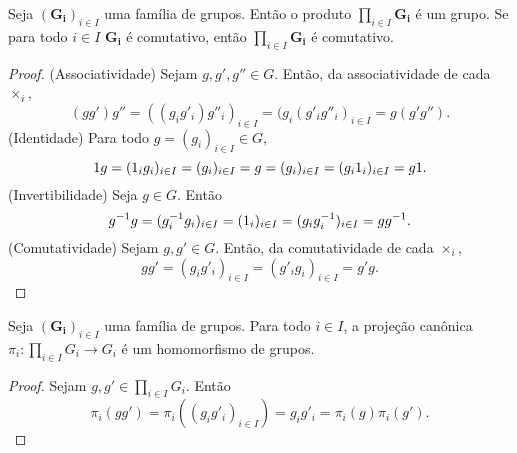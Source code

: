 \begin{proposition}
\label{alge:prop.gru.prod}
Seja $(\bm{G_i})_{i \in I}$ uma família de grupos. Então o produto $\prod_{i \in I} \bm{G_i}$ é um grupo. Se para todo $i \in I$ $\bm{G_i}$ é comutativo, então $\prod_{i \in I} \bm{G_i}$ é comutativo.
\end{proposition}
\begin{proof}
(Associatividade) Sejam $g,g',g'' \in G$. Então, da associatividade de cada $\times_i$,
		\begin{equation*}
		(gg')g'' = ((g_ig'_i)g''_i)_{i \in I} = (g_i(g'_ig''_i)_{i \in I} = g(g'g'').
		\end{equation*}
	(Identidade) Para todo $g=(g_i)_{i \in I} \in G$,
		\begin{equation*}
		1 g = (1_ig_i)_{i \in I} = (g_i)_{i \in I} = g = (g_i)_{i \in I} =(g_i1_i)_{i \in I} = g 1.
		\end{equation*}
	(Invertibilidade) Seja $g \in G$. Então
	\begin{equation*}
	g^{-1} g = (g_i^{-1} g_i)_{i \in I} = (1_i)_{i \in I} = (g_ig_i^{-1})_{i \in I} = gg^{-1}.
	\end{equation*}
	(Comutatividade) Sejam $g,g' \in G$. Então, da comutatividade de cada $ \times _i$,
	\begin{equation*}
	gg' = (g_ig'_i)_{i \in I} = (g'_ig_i)_{i \in I} = g'g.
	\end{equation*}
\end{proof}

\begin{proposition}
Seja $(\bm{G_i})_{i \in I}$ uma família de grupos. Para todo $i \in I$, a projeção canônica $\pi_i: \prod_{i \in I} G_i \to G_i$ é um homomorfismo de grupos.
\end{proposition}
\begin{proof}
Sejam $g,g' \in \prod_{i \in I} G_i$. Então
	\begin{equation*}
	\pi_i(gg') = \pi_i((g_ig'_i)_{i \in I}) = g_ig'_i = \pi_i(g)\pi_i(g').
	\end{equation*}
\end{proof}

